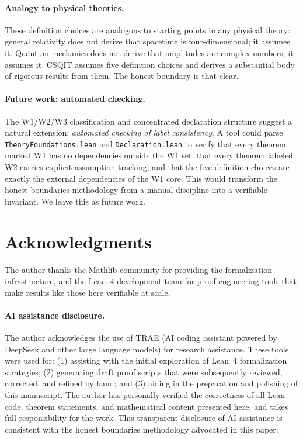 ﻿\documentclass[11pt]{article}
\begin{document}
\paragraph{Analogy to physical theories.}
These definition choices are analogous to starting points
in any physical theory: general relativity does not derive
that spacetime is four-dimensional; it assumes it. Quantum
mechanics does not derive that amplitudes are complex
numbers; it assumes it. CSQIT assumes five definition
choices and derives a substantial body of rigorous results
from them. The honest boundary is that clear.

\paragraph{Future work: automated checking.}
The W1/W2/W3 classification and concentrated declaration
structure suggest a natural extension: \emph{automated
checking of label consistency}. A tool could parse
\texttt{TheoryFoundations.lean} and \texttt{Declaration.lean}
to verify that every theorem marked W1 has no dependencies
outside the W1 set, that every theorem labeled W2 carries
explicit assumption tracking, and that the five definition
choices are exactly the external dependencies of the W1
core. This would transform the honest boundaries methodology
from a manual discipline into a verifiable invariant. We
leave this as future work.

\section*{Acknowledgments}
The author thanks the Mathlib community for providing the
formalization infrastructure, and the Lean~4 development
team for proof engineering tools that make results like
those here verifiable at scale.

\paragraph{AI assistance disclosure.}
The author acknowledges the use of TRAE (AI coding assistant
powered by DeepSeek and other large language models) for
research assistance. These tools were used for: (1) assisting
with the initial exploration of Lean~4 formalization strategies;
(2) generating draft proof scripts that were subsequently
reviewed, corrected, and refined by hand; and (3) aiding in
the preparation and polishing of this manuscript. The author
has personally verified the correctness of all Lean code,
theorem statements, and mathematical content presented here,
and takes full responsibility for the work. This transparent
disclosure of AI assistance is consistent with the honest
boundaries methodology advocated in this paper.
\end{document}
